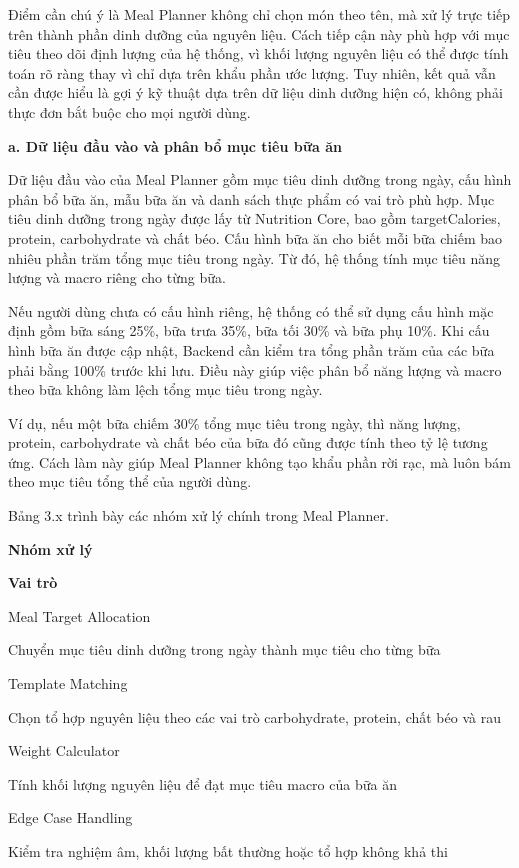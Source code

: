 \documentclass[12pt, a4paper]{report}
\begin{document}
Điểm cần chú ý là Meal Planner không chỉ chọn món theo tên, mà xử lý trực tiếp trên thành phần dinh dưỡng của nguyên liệu. Cách tiếp cận này phù hợp với mục tiêu theo dõi định lượng của hệ thống, vì khối lượng nguyên liệu có thể được tính toán rõ ràng thay vì chỉ dựa trên khẩu phần ước lượng. Tuy nhiên, kết quả vẫn cần được hiểu là gợi ý kỹ thuật dựa trên dữ liệu dinh dưỡng hiện có, không phải thực đơn bắt buộc cho mọi người dùng.

\textbf{a. Dữ liệu đầu vào và phân bổ mục tiêu bữa ăn}

Dữ liệu đầu vào của Meal Planner gồm mục tiêu dinh dưỡng trong ngày, cấu hình phân bổ bữa ăn, mẫu bữa ăn và danh sách thực phẩm có vai trò phù hợp. Mục tiêu dinh dưỡng trong ngày được lấy từ Nutrition Core, bao gồm targetCalories, protein, carbohydrate và chất béo. Cấu hình bữa ăn cho biết mỗi bữa chiếm bao nhiêu phần trăm tổng mục tiêu trong ngày. Từ đó, hệ thống tính mục tiêu năng lượng và macro riêng cho từng bữa.

Nếu người dùng chưa có cấu hình riêng, hệ thống có thể sử dụng cấu hình mặc định gồm bữa sáng 25\%, bữa trưa 35\%, bữa tối 30\% và bữa phụ 10\%. Khi cấu hình bữa ăn được cập nhật, Backend cần kiểm tra tổng phần trăm của các bữa phải bằng 100\% trước khi lưu. Điều này giúp việc phân bổ năng lượng và macro theo bữa không làm lệch tổng mục tiêu trong ngày.

Ví dụ, nếu một bữa chiếm 30\% tổng mục tiêu trong ngày, thì năng lượng, protein, carbohydrate và chất béo của bữa đó cũng được tính theo tỷ lệ tương ứng. Cách làm này giúp Meal Planner không tạo khẩu phần rời rạc, mà luôn bám theo mục tiêu tổng thể của người dùng.

Bảng 3.x trình bày các nhóm xử lý chính trong Meal Planner.

\textbf{Nhóm xử lý}

\textbf{Vai trò}

Meal Target Allocation

Chuyển mục tiêu dinh dưỡng trong ngày thành mục tiêu cho từng bữa

Template Matching

Chọn tổ hợp nguyên liệu theo các vai trò carbohydrate, protein, chất béo và rau

Weight Calculator

Tính khối lượng nguyên liệu để đạt mục tiêu macro của bữa ăn

Edge Case Handling

Kiểm tra nghiệm âm, khối lượng bất thường hoặc tổ hợp không khả thi
\end{document}
